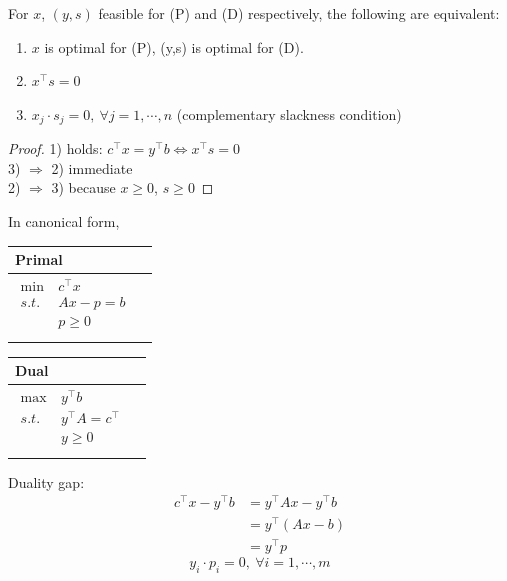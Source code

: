 \documentclass[11pt]{article}
\numberwithin{equation}{section}
\begin{document}
\begin{theorem}
    For $x$, $(y, s)$ feasible for (P) and (D) respectively, the following are equivalent:
    \begin{enumerate}[1)]
        \item $x$ is optimal for (P), (y,s) is optimal for (D).
        \item $x^\top s=0$
        \item $x_j \cdot s_j=0, \ \forall j=1,\cdots,n$ (complementary slackness condition)
    \end{enumerate}
    \begin{proof}
        1) holds: $c^{\top} x=y^{\top} b \Leftrightarrow x^{\top} s=0$\\
        3) $\Rightarrow$ 2) immediate\\
        2) $\Rightarrow$ 3) because $x \geq 0$, $s \geq 0$
    \end{proof}
\end{theorem}

In canonical form, 
\begin{table}[H]
    \begin{minipage}[t]{.5\linewidth}
        \vspace{0pt}
        \centering
        \begin{tabular}{ll}
            Primal \\ \hline
            \parbox{5cm}{\begin{align*}
                \min \ & c^\top x \\
                s.t. \ & Ax - p= b \\
                \ & p \geq 0 \\
            \end{align*}}
        \end{tabular}
    \end{minipage}%
    \begin{minipage}[t]{.5\linewidth}
        \vspace{0pt}
        \centering
        \begin{tabular}{ll}
            Dual \\ \hline
            \parbox{5cm}{\begin{align*}
                \max \ & y^\top b \\
                s.t. \ &y^\top A = c^\top \\
                &y \geq 0 \\
            \end{align*}}
        \end{tabular}
    \end{minipage} 
\end{table}
Duality gap:
\begin{align*}
    c^{\top} x-y^{\top} b &= y^{\top} Ax - y^{\top} b \\
    &= y^{\top} (Ax-b) \\
    &= y^\top p
\end{align*}
\begin{equation}\label{eq:6-1}
    y_i \cdot p_i = 0, \ \forall i = 1, \cdots, m
\end{equation}
\end{document}
